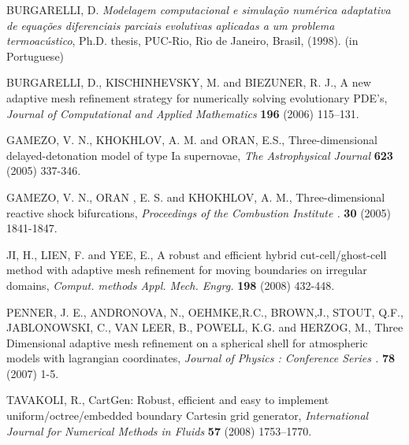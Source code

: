\begin{thebibliography}{99}

 BURGARELLI, D. \textit{Modelagem computacional e
simula\c c\~ao num\'erica adaptativa de equa\c c\~oes diferenciais
parciais evolutivas aplicadas a um problema termoac\'ustico}, Ph.D. thesis, PUC-Rio, Rio de Janeiro, Brasil, (1998). (in
Portuguese)

BURGARELLI, D., KISCHINHEVSKY, M. and BIEZUNER, R. J.,
A new adaptive mesh refinement strategy for numerically solving
evolutionary PDE's, \textit{Journal of Computational and Applied
Mathematics} \textbf{196} (2006) 115--131.


  GAMEZO, V. N.,  KHOKHLOV, A. M. and ORAN, E.S.,
Three-dimensional delayed-detonation model of type Ia supernovae, \textit{The Astrophysical Journal} \textbf{623} (2005) 337-346.


  GAMEZO, V. N., ORAN , E. S. and   KHOKHLOV, A. M.,
Three-dimensional reactive shock bifurcations, \textit{Proceedings of the Combustion Institute .} \textbf{30} (2005) 1841-1847.


  JI, H., LIEN, F. and   YEE, E.,
A robust and efficient hybrid cut-cell/ghost-cell method with adaptive mesh refinement for moving boundaries on irregular domains, \textit{Comput. methods Appl. Mech. Engrg.} \textbf{198} (2008) 432-448.


  PENNER, J. E., ANDRONOVA, N.,  OEHMKE,R.C., BROWN,J., STOUT, Q.F., JABLONOWSKI, C., VAN LEER, B., POWELL, K.G. and  HERZOG, M.,
Three Dimensional adaptive mesh refinement on a spherical shell for atmospheric  models with lagrangian coordinates, \textit{Journal of Physics : Conference Series .} \textbf{78} (2007) 1-5.



 TAVAKOLI, R.,
CartGen: Robust, efficient and easy to implement uniform/octree/embedded boundary Cartesin grid generator, \textit{International Journal for Numerical Methods in Fluids} \textbf{57} (2008) 1753--1770.



\end{thebibliography}
